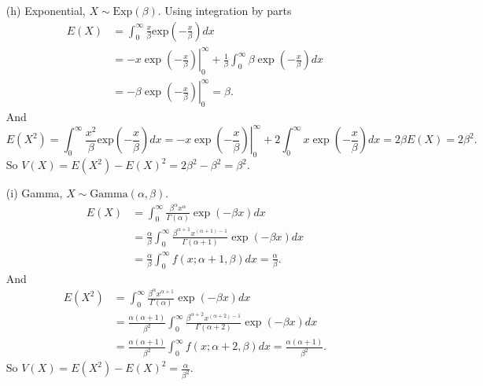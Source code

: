 \begin{itemize}
\item[(h)] Exponential, $X \sim \mathrm{Exp}(\beta)$.
Using integration by parts
\begin{equation*}
\begin{split}
E(X) &= \int_0^{\infty} \frac{x}{\beta} \mathrm{exp}\left(-\frac{x}{\beta}\right) dx \\
    &= -\left.x \exp\left(-\frac{x}{\beta}\right)\right|_0^{\infty} + \frac{1}{\beta}\int_0^{\infty} \beta \exp\left(-\frac{x}{\beta}\right) dx \\
    &= \left.-\beta \exp\left(-\frac{x}{\beta}\right)\right|_0^{\infty}
    = \beta.
\end{split}
\end{equation*}
And
\begin{equation*}
E(X^2) = \int_0^{\infty} \frac{x^2}{\beta} \mathrm{exp}\left(-\frac{x}{\beta}\right) dx
    = -\left. x\exp\left(-\frac{x}{\beta}\right)\right|_0^{\infty} + 2 \int_0^{\infty} x \exp\left(-\frac{x}{\beta}\right) dx
    = 2 \beta E(X) = 2 \beta^2.
\end{equation*}
So $V(X) = E(X^2) - E(X)^2 = 2 \beta^2 - \beta^2 = \beta^2$.

\item[(i)] Gamma, $X \sim \mathrm{Gamma}(\alpha, \beta)$.
\begin{equation*}
\begin{split}
E(X) &= \int_{0}^{\infty} \frac{\beta^{\alpha} x^{\alpha}}{\Gamma(\alpha)} \exp(-\beta x) dx \\
    &= \frac{\alpha}{\beta} \int_0^{\infty} \frac{\beta^{\alpha + 1} x^{(\alpha + 1) - 1}}{\Gamma(\alpha + 1)} \exp(-\beta x) dx \\
    &= \frac{\alpha}{\beta} \int_0^{\infty} f(x; \alpha + 1, \beta) dx
    = \frac{\alpha}{\beta}.
\end{split}
\end{equation*}
And
\begin{equation*}
\begin{split}
E(X^2) &= \int_{0}^{\infty} \frac{\beta^{\alpha} x^{\alpha + 1}}{\Gamma(\alpha)} \exp(-\beta x) dx \\
    &= \frac{\alpha(\alpha + 1)}{\beta^2} \int_0^{\infty} \frac{\beta^{\alpha + 2} x^{(\alpha + 2) - 1}}{\Gamma(\alpha + 2)} \exp(-\beta x) dx \\
    &= \frac{\alpha(\alpha + 1)}{\beta^2} \int_0^{\infty} f(x; \alpha + 2, \beta) dx
    = \frac{\alpha(\alpha + 1)}{\beta^2}.
\end{split}
\end{equation*}
So $V(X) = E(X^2) - E(X)^2 = \frac{\alpha}{\beta^2}$.


\end{itemize}
